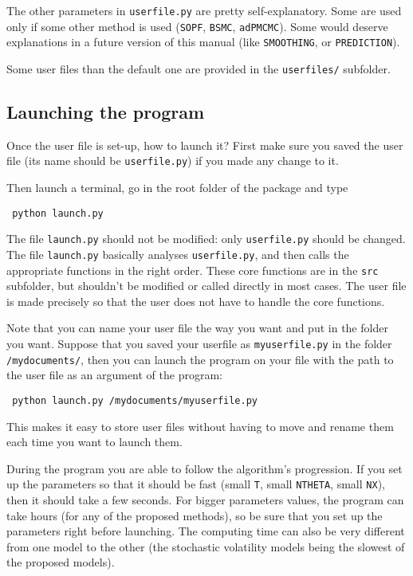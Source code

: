 \documentclass[a4paper,10pt]{paper}
\begin{document}
The other parameters in \texttt{userfile.py} are pretty self-explanatory. Some are used only if some other method is used (\texttt{SOPF}, \texttt{BSMC}, \texttt{adPMCMC}).
Some would deserve explanations in a future version of this manual (like \texttt{SMOOTHING}, or \texttt{PREDICTION}).

Some user files than the default one are provided in the \texttt{userfiles/} subfolder.

\subsection{Launching the program}

Once the user file is set-up, how to launch it? First make sure you saved the user file (its name should be \texttt{userfile.py}) if you made any change to it.

Then launch a terminal, go in the root folder of the package and type
\begin{center}
 \begin{lstlisting}
 python launch.py
\end{lstlisting}
\end{center}

The file \texttt{launch.py} should not be modified: only \texttt{userfile.py} should be changed. The file \texttt{launch.py} basically analyses \texttt{userfile.py}, and then calls the appropriate functions in the right order. These core functions are in the \texttt{src} subfolder, but shouldn't be modified or called directly in most cases. The user file is made precisely so that the user does not have to handle the core functions.

Note that you can name your user file the way you want and put in the folder you want. Suppose that you saved your userfile as \texttt{myuserfile.py} in
the folder \texttt{/mydocuments/}, then you can launch the program on your file with the path to the user file as an argument of the program:
\begin{center}
 \begin{lstlisting}
 python launch.py /mydocuments/myuserfile.py
\end{lstlisting}
\end{center}
This makes it easy to store user files without having to move and rename them each time you want to launch them.

During the program you are able to follow the algorithm's progression. If you set up the parameters so that it should be fast (small \texttt{T}, small \texttt{NTHETA}, small \texttt{NX}), then it should take a few seconds. For bigger parameters values, the program can take hours (for any of the proposed methods), so be sure that you set up
the parameters right before launching. The computing time can also be very different from one model to the other (the stochastic volatility models being the slowest of the proposed models).
\end{document}
